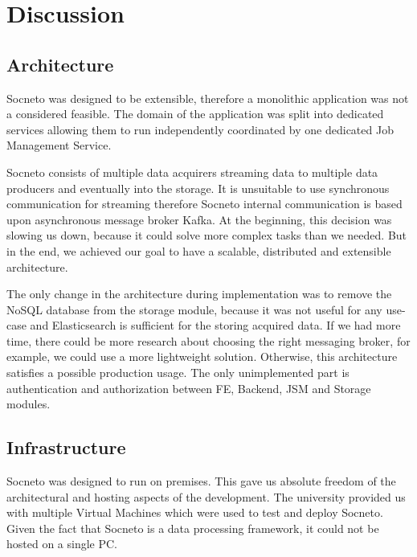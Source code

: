\chapter{Discussion}

\section{Architecture}
Socneto was designed to be extensible, therefore a monolithic application was not a considered feasible. The domain of the application was split into dedicated services allowing them to run independently coordinated by one dedicated Job Management Service.

Socneto consists of multiple data acquirers streaming data to multiple data producers and eventually into the storage. It is unsuitable to use synchronous communication for streaming therefore Socneto internal communication is based upon asynchronous message broker Kafka. At the beginning, this decision was slowing us down, because it could solve more complex tasks than we needed. But in the end, we achieved our goal to have a scalable, distributed and extensible architecture. 

The only change in the architecture during implementation was to remove the NoSQL database from the storage module, because it was not useful for any use-case and Elasticsearch is sufficient for the storing acquired data. If we had more time, there could be more research about choosing the right messaging broker, for example, we could use a more lightweight solution. Otherwise, this architecture satisfies a possible production usage. The only unimplemented part is authentication and authorization between FE, Backend, JSM and Storage modules.

\section{Infrastructure}
% 
Socneto was designed to run on premises. This gave us absolute freedom of the architectural and hosting aspects of the development. The university provided us with multiple Virtual Machines which were used to test and deploy Socneto. Given the fact that Socneto is a data processing framework, it could not be hosted on a single PC. 

